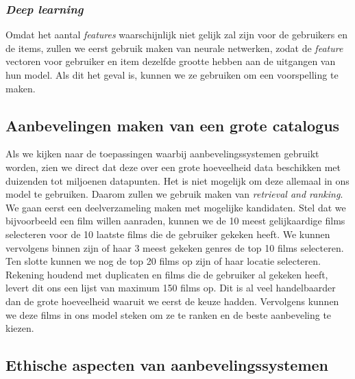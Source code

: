 \subsubsection{\textit{Deep learning}}

Omdat het aantal \textit{features} waarschijnlijk niet gelijk zal  zijn voor de gebruikers en de items, zullen we eerst gebruik maken van neurale netwerken, zodat de \textit{feature} vectoren voor gebruiker en item dezelfde grootte hebben aan de uitgangen van hun model. Als dit het geval is, kunnen we ze gebruiken om een voorspelling te maken.

\subsection{Aanbevelingen maken van een grote catalogus}

Als we kijken naar de toepassingen waarbij aanbevelingssystemen gebruikt worden, zien we direct dat deze over een grote hoeveelheid data beschikken met duizenden tot miljoenen datapunten. Het is niet mogelijk om deze allemaal in ons model te gebruiken. Daarom zullen we gebruik maken van \textit{retrieval and ranking}.\\
\newline
We gaan eerst een deelverzameling maken met mogelijke kandidaten. Stel dat we bijvoorbeeld een film willen aanraden, kunnen we de 10 meest gelijkaardige films selecteren voor de 10 laatste films die de gebruiker gekeken heeft. We kunnen vervolgens binnen zijn of haar 3 meest gekeken genres de top 10 films selecteren. Ten slotte kunnen we nog de top 20 films op zijn of haar locatie selecteren. Rekening houdend met duplicaten en films die de gebruiker al gekeken heeft, levert dit ons een lijst van maximum 150 films op. Dit is al veel handelbaarder dan de grote hoeveelheid waaruit we eerst de keuze hadden. Vervolgens kunnen we deze films in ons model steken om ze te ranken en de beste aanbeveling te kiezen.
\newpage

\subsection{Ethische aspecten  van aanbevelingssystemen}

